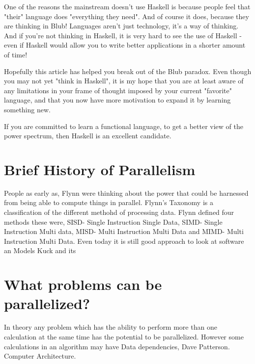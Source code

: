 \documentclass{report}
\begin{document}
One of the reasons the mainstream doesn't use Haskell is because people feel that "their" language does "everything they need". And of course it does, because they are thinking in Blub! Languages aren't just technology, it's a way of thinking. And if you're not thinking in Haskell, it is very hard to see the use of Haskell - even if Haskell would allow you to write better applications in a shorter amount of time!

Hopefully this article has helped you break out of the Blub paradox. Even though you may not yet "think in Haskell", it is my hope that you are at least aware of any limitations in your frame of thought imposed by your current "favorite" language, and that you now have more motivation to expand it by learning something new.

If you are committed to learn a functional language, to get a better view of the power spectrum, then Haskell is an excellent candidate.


\section {Brief History of Parallelism}
People as early as, Flynn were thinking about the power that could be harnessed from being able to compute things in parallel.
Flynn's Taxonomy is a classification of the different methohd of processing data. Flynn defined four methods these were, SISD- Single Instruction Single Data, SIMD- Single Instruction Multi data, MISD- Multi Instruction Multi Data and MIMD- Multi Instruction Multi Data. Even today it is still good approach to look at software an
Models Kuck and its

\section {What problems can be parallelized?}
In theory any problem which has the ability to perform more than one calculation at the same time has the potential to be parallelized. However some calculations in an algorithm may have Data dependencies, 
Dave Patterson. Computer Architecture.
\end{document}
